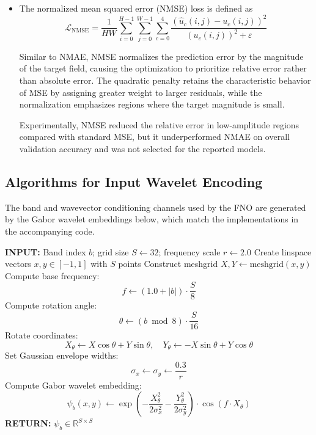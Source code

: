 \documentclass[preprint,review,12pt,numafflabel]{elsarticle}
\begin{document}
\begin{itemize}
Experimentally, NMAE gave the best overall balance across channels with disparate magnitudes and was selected as the training objective for all reported results. Relative-error emphasis improved reconstruction of low-amplitude displacement components without sacrificing usable accuracy on larger-magnitude channels, which made NMAE preferable to MAE, MSE, NMSE, and SSIM for this application.

\item The normalized mean squared error (NMSE) loss is defined as
\begin{equation*}
    \mathcal{L}_{\text{NMSE}} = \frac{1}{HW} \sum_{i=0}^{H-1} \sum_{j=0}^{W-1} \sum_{c=0}^{4} \frac{\displaystyle \left(\hat{u}_{c}(i,j) - u_{c}(i,j) \right)^2}{\left( u_{c}(i,j) \right)^2 + \varepsilon}
\end{equation*}

Similar to NMAE, NMSE normalizes the prediction error by the magnitude of the target field, causing the optimization to prioritize relative error rather than absolute error. The quadratic penalty retains the characteristic behavior of MSE by assigning greater weight to larger residuals, while the normalization emphasizes regions where the target magnitude is small.

Experimentally, NMSE reduced the relative error in low-amplitude regions compared with standard MSE, but it underperformed NMAE on overall validation accuracy and was not selected for the reported models.
\end{itemize}

\subsection{Algorithms for Input Wavelet Encoding}
\label{ssec:input_wavelet_algorithms}
The band and wavevector conditioning channels used by the FNO are generated by the Gabor wavelet embeddings below, which match the implementations in the accompanying code.
\begin{algorithm}[H]
\caption{1D Gabor Wavelet Embedding from Band Index}
\label{alg:1d_gabor_embedding}
\begin{algorithmic}[1]
\STATE \textbf{INPUT:} Band index \( b \); grid size \( S \leftarrow 32 \); frequency scale \( r \leftarrow 2.0 \)
\STATE Create linspace vectors \( x, y \in [-1, 1] \) with \( S \) points
\STATE Construct meshgrid \( X, Y \leftarrow \text{meshgrid}(x, y) \)
\STATE Compute base frequency:
\[
f \leftarrow (1.0 + |b|) \cdot \frac{S}{8}
\]
\STATE Compute rotation angle:
\[
\theta \leftarrow (b \bmod 8) \cdot \frac{S}{16}
\]
\STATE Rotate coordinates:
\[
X_\theta \leftarrow X \cos \theta + Y \sin \theta, \quad
Y_\theta \leftarrow -X \sin \theta + Y \cos \theta
\]
\STATE Set Gaussian envelope widths:
\[
\sigma_x \leftarrow \sigma_y \leftarrow \frac{0.3}{r}
\]
\STATE Compute Gabor wavelet embedding:
\[
\psi_b(x, y) \leftarrow
\exp\left(-\frac{X_\theta^2}{2 \sigma_x^2} - \frac{Y_\theta^2}{2 \sigma_y^2}\right)
\cdot \cos(f \cdot X_\theta)
\]
\STATE \textbf{RETURN:} \( \psi_b \in \mathbb{R}^{S \times S} \)
\end{algorithmic}
\end{algorithm}
\end{document}
